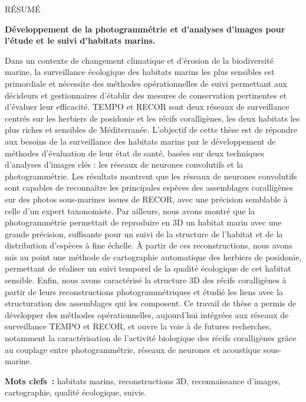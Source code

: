 \small
{}
{\centerline {{\sffamily \Large RÉSUMÉ}}}

\noindent\textbf{Développement de la photogrammétrie et d’analyses d’images pour l’étude et le suivi d’habitats marins.}

\noindent Dans un contexte de changement climatique et d’érosion de la biodiversité marine, la surveillance écologique des habitats marins les plus sensibles est primordiale et nécessite des méthodes opérationnelles de suivi permettant aux décideurs et gestionnaires d’établir des mesures de conservation pertinentes et d’évaluer leur efficacité. TEMPO et RECOR sont deux réseaux de surveillance centrés sur les herbiers de posidonie et les récifs coralligènes, les deux habitats les plus riches et sensibles de Méditerranée. L’objectif de cette thèse est de répondre aux besoins de la surveillance des habitats marins par le développement de méthodes d’évaluation de leur état de santé, basées sur deux techniques d’analyses d’images clés : les réseaux de neurones convolutifs et la photogrammétrie. Les résultats montrent que les réseaux de neurones convolutifs sont capables de reconnaître les principales espèces des assemblages coralligènes sur des photos sous-marines issues de RECOR, avec une précision semblable à celle d’un expert taxonomiste. Par ailleurs, nous avons montré que la photogrammétrie permettait de reproduire en 3D un habitat marin avec une grande précision, suffisante pour un suivi de la structure de l’habitat et de la distribution d’espèces à fine échelle. À partir de ces reconstructions, nous avons mis au point une méthode de cartographie automatique des herbiers de posidonie, permettant de réaliser un suivi temporel de la qualité écologique de cet habitat sensible. Enfin, nous avons caractérisé la structure 3D des récifs coralligènes à partir de leurs reconstructions photogrammétriques et étudié les liens avec la structuration des assemblages qui les composent. Ce travail de thèse a permis de développer des méthodes opérationnelles, aujourd’hui intégrées aux réseaux de surveillance TEMPO et RECOR, et ouvre la voie à de futures recherches, notamment la caractérisation de l’activité biologique des récifs coralligènes grâce au couplage entre photogrammétrie, réseaux de neurones et acoustique sous-marine.

\noindent\textbf{Mots clefs~: }{habitats marins, reconstructions 3D, reconnaissance d’images, cartographie, qualité écologique, suivis}.
\vskip 0.2cm
\noindent

